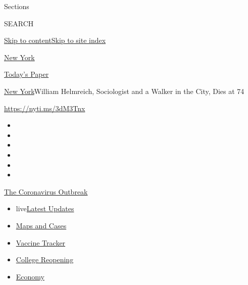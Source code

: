 Sections

SEARCH

\protect\hyperlink{site-content}{Skip to
content}\protect\hyperlink{site-index}{Skip to site index}

\href{https://www.nytimes3xbfgragh.onion/section/nyregion}{New York}

\href{https://myaccount.nytimes3xbfgragh.onion/auth/login?response_type=cookie\&client_id=vi}{}

\href{https://www.nytimes3xbfgragh.onion/section/todayspaper}{Today's
Paper}

\href{/section/nyregion}{New York}\textbar{}William Helmreich,
Sociologist and a Walker in the City, Dies at 74

\url{https://nyti.ms/3dM3Tnx}

\begin{itemize}
\item
\item
\item
\item
\item
\item
\end{itemize}

\href{https://www.nytimes3xbfgragh.onion/news-event/coronavirus?action=click\&pgtype=Article\&state=default\&region=TOP_BANNER\&context=storylines_menu}{The
Coronavirus Outbreak}

\begin{itemize}
\tightlist
\item
  live\href{https://www.nytimes3xbfgragh.onion/2020/08/04/world/coronavirus-covid-19.html?action=click\&pgtype=Article\&state=default\&region=TOP_BANNER\&context=storylines_menu}{Latest
  Updates}
\item
  \href{https://www.nytimes3xbfgragh.onion/interactive/2020/us/coronavirus-us-cases.html?action=click\&pgtype=Article\&state=default\&region=TOP_BANNER\&context=storylines_menu}{Maps
  and Cases}
\item
  \href{https://www.nytimes3xbfgragh.onion/interactive/2020/science/coronavirus-vaccine-tracker.html?action=click\&pgtype=Article\&state=default\&region=TOP_BANNER\&context=storylines_menu}{Vaccine
  Tracker}
\item
  \href{https://www.nytimes3xbfgragh.onion/2020/08/02/us/covid-college-reopening.html?action=click\&pgtype=Article\&state=default\&region=TOP_BANNER\&context=storylines_menu}{College
  Reopening}
\item
  \href{https://www.nytimes3xbfgragh.onion/live/2020/08/03/business/stock-market-today-coronavirus?action=click\&pgtype=Article\&state=default\&region=TOP_BANNER\&context=storylines_menu}{Economy}
\end{itemize}

